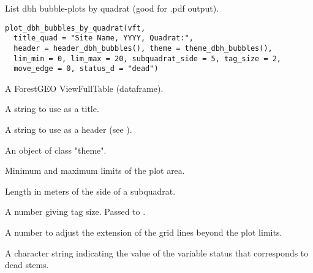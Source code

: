 \documentclass[a4paper]{book}
\begin{document}
%
\begin{Examples}
\end{Examples}
%
\begin{Description}\relax
List dbh bubble-plots by quadrat (good for .pdf output).
\end{Description}
%
\begin{Usage}
\begin{verbatim}
plot_dbh_bubbles_by_quadrat(vft,
  title_quad = "Site Name, YYYY, Quadrat:",
  header = header_dbh_bubbles(), theme = theme_dbh_bubbles(),
  lim_min = 0, lim_max = 20, subquadrat_side = 5, tag_size = 2,
  move_edge = 0, status_d = "dead")
\end{verbatim}
\end{Usage}
%
\begin{Arguments}
\begin{ldescription}
\item[\code{vft}] A ForestGEO ViewFullTable (dataframe).

\item[\code{title\_quad}] A string to use as a title.

\item[\code{header}] A string to use as a header (see ).

\item[\code{theme}] An object of class "theme".

\item[\code{lim\_min, lim\_max}] Minimum and maximum limits of the plot area.

\item[\code{subquadrat\_side}] Length in meters of the side of a subquadrat.

\item[\code{tag\_size}] A number giving tag size. Passed to
.

\item[\code{move\_edge}] A number to adjust the extension of the grid lines beyond
the plot limits.

\item[\code{status\_d}] A character string indicating the value of the variable
status that corresponds to dead stems.
\end{ldescription}
\end{Arguments}
\end{document}
